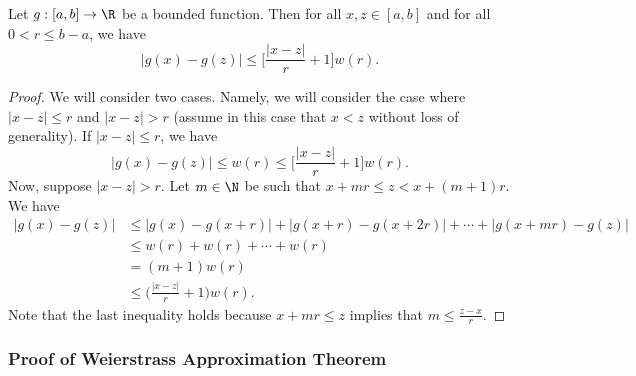\begin{prop}[Fact 2]\label{Fact 2}
    Let \( g:[a,b] \to \R  \) be a bounded function. Then for all \( x ,z \in [a,b] \) and for all \( 0 < r \leq b - a  \), we have 
    \[  | g(x) - g(z) |  \leq \Big[ \frac{ | x - z  |   }{  r  }  + 1 \Big] w(r). \]
\end{prop}
\begin{proof}
We will consider two cases. Namely, we will consider the case where \( |  x - z  |  \leq r  \) and \( |  x - z  |  > r  \) (assume in this case that \( x < z  \) without loss of generality). If \( |  x - z  |  \leq r  \), we have 
\[  | g(x) - g(z) |  \leq w(r) \leq \Big[ \frac{ | x - z  |   }{  r  }  + 1  \Big]w(r).   \]
Now, suppose \( |  x -z  |  > r  \). Let \( m \in \N  \) be such that \( x + mr \leq z < x + (m+1)r \). We have 
\begin{align*}
    | g(x) - g(z) | &\leq | g(x) - g(x + r)  |  + | g(x+r) - g(x + 2r) |  + \cdots + | g(x + mr) - g(z)  |   \\
                    &\leq w(r) + w(r) + \cdots + w(r) \\
                    &= (m + 1)w(r) \\
                    &\leq \Big(  \frac{ | x - z  |  }{ r  }  + 1  \Big) w(r).
\end{align*}
Note that the last inequality holds because \( x + mr \leq z  \) implies that \( m \leq \frac{ z - x  }{ r  }  \).
\end{proof}

\subsubsection{Proof of Weierstrass Approximation Theorem}

